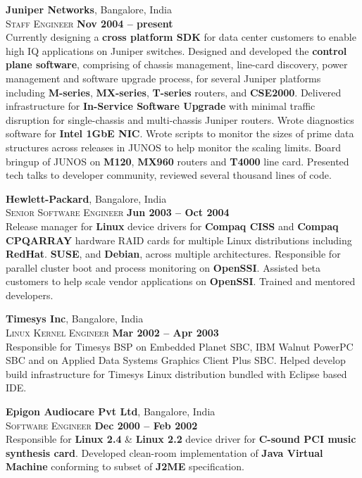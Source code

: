 \documentclass[margin,line]{resume}
\begin{document}
\begin{resume}
    \textbf{Juniper Networks}, Bangalore, India \\\vspace{1mm}%
    \textsc{Staff Engineer} \hfill \textbf{Nov 2004 -- present}\\
    Currently designing a {\bf cross platform SDK} for data center
    customers to enable high IQ applications on Juniper switches.
    Designed and developed the {\bf control plane software},
    comprising of chassis management, line-card discovery, power
    management and software upgrade process, for several Juniper
    platforms including {\bf M-series}, {\bf MX-series}, {\bf
    T-series} routers, and {\bf CSE2000}. Delivered infrastructure for
    {\bf In-Service Software Upgrade} with minimal traffic disruption
    for single-chassis and multi-chassis Juniper routers. Wrote
    diagnostics software for {\bf Intel 1GbE NIC}. Wrote scripts to
    monitor the sizes of prime data structures across releases in
    JUNOS to help monitor the scaling limits. Board bringup of JUNOS
    on {\bf M120}, {\bf MX960} routers and {\bf T4000} line card.
    Presented tech talks to developer community, reviewed several
    thousand lines of code.

    \textbf{Hewlett-Packard}, Bangalore, India \\\vspace{1mm}%
    \textsc{Senior Software Engineer} \hfill \textbf{Jun 2003 -- Oct 2004}\\
    Release manager for {\bf Linux} device drivers for {\bf Compaq
    CISS} and {\bf Compaq CPQARRAY} hardware RAID cards for multiple
    Linux distributions including {\bf RedHat}. {\bf SUSE}, and {\bf
    Debian}, across multiple architectures. Responsible for parallel
    cluster boot and process monitoring on {\bf OpenSSI}. Assisted
    beta customers to help scale vendor applications on {\bf OpenSSI}.
    Trained and mentored developers.

    \textbf{Timesys Inc}, Bangalore, India \\\vspace{1mm}%
    \textsc{Linux Kernel Engineer} \hfill \textbf{Mar 2002 -- Apr 2003}\\
    Responsible for Timesys BSP on Embedded Planet SBC, IBM Walnut
    PowerPC SBC and on Applied Data Systems Graphics Client Plus SBC.
    Helped develop build infrastructure for Timesys Linux distribution
    bundled with Eclipse based IDE.

    \textbf{Epigon Audiocare Pvt Ltd}, Bangalore, India \\\vspace{1mm}%
    \textsc{Software Engineer} \hfill \textbf{Dec 2000 -- Feb 2002}\\
    Responsible for {\bf Linux 2.4} \& {\bf Linux 2.2} device driver
    for {\bf C-sound PCI music synthesis card}. Developed clean-room
    implementation of {\bf Java Virtual Machine} conforming to subset
    of {\bf J2ME} specification.
    


\end{resume}
\end{document}
